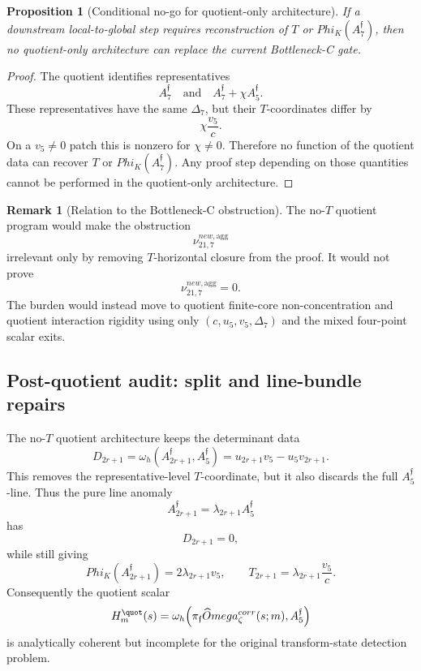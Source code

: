 \documentclass[11pt,a4paper]{amsart}
\def\Omega{Omega}%
\def\Phi{Phi}%
\def\corr{corr}%
\def\new{new}%
\theoremstyle{plain}
\newtheorem{proposition}[theorem]{Proposition}
\theoremstyle{definition}
\newtheorem{remark}[theorem]{Remark}
\newcommand{\corr}{\mathrm{corr}}
\newcommand{\new}{\mathrm{new}}
\begin{document}
\begin{proposition}[Conditional no-go for quotient-only architecture]
\label{prop:conditional-no-go-quotient-only-architecture}
If a downstream local-to-global step requires reconstruction of \(T\) or
\(\Phi_K(A_7^{\mathfrak f})\), then no quotient-only architecture can replace
the current Bottleneck-C gate.
\end{proposition}

\begin{proof}
The quotient identifies representatives
\[
A_7^{\mathfrak f}
\quad\text{and}\quad
A_7^{\mathfrak f}+\chi A_5^{\mathfrak f}.
\]
These representatives have the same \(\Delta_7\), but their \(T\)-coordinates
differ by
\[
\chi\frac{v_5}{c}.
\]
On a \(v_5\ne0\) patch this is nonzero for \(\chi\ne0\).  Therefore no
function of the quotient data can recover \(T\) or
\(\Phi_K(A_7^{\mathfrak f})\).  Any proof step depending on those quantities
cannot be performed in the quotient-only architecture.
\end{proof}

\begin{remark}[Relation to the Bottleneck-C obstruction]
\label{rem:no-t-relation-to-bc-obstruction}
The no-\(T\) quotient program would make the obstruction
\[
\nu_{21,7}^{\new,\mathrm{agg}}
\]
irrelevant only by removing \(T\)-horizontal closure from the proof.  It would
not prove
\[
\nu_{21,7}^{\new,\mathrm{agg}}=0.
\]
The burden would instead move to quotient finite-core non-concentration and
quotient interaction rigidity using only \((c,u_5,v_5,\Delta_7)\) and the
mixed four-point scalar exits.
\end{remark}

\subsection{Post-quotient audit: split and line-bundle repairs}
\label{subsec:post-quotient-split-line-bundle-audit}

The no-\(T\) quotient architecture keeps the determinant data
\[
D_{2r+1}
=
\omega_h(A_{2r+1}^{\mathfrak f},A_5^{\mathfrak f})
=
u_{2r+1}v_5-u_5v_{2r+1}.
\]
This removes the representative-level \(T\)-coordinate, but it also discards
the full \(A_5^{\mathfrak f}\)-line.  Thus the pure line anomaly
\[
A_{2r+1}^{\mathfrak f}
=
\lambda_{2r+1}A_5^{\mathfrak f}
\]
has
\[
D_{2r+1}=0,
\]
while still giving
\[
\Phi_K(A_{2r+1}^{\mathfrak f})
=
2\lambda_{2r+1}v_5,
\qquad
T_{2r+1}
=
\lambda_{2r+1}\frac{v_5}{c}.
\]
Consequently the quotient scalar
\[
H_m^{\quot}(s)
=
\omega_h\!\left(
\pi_{\mathfrak f}\widehat\Omega_\zeta^{\corr}(s;m),
A_5^{\mathfrak f}
\right)
\]
is analytically coherent but incomplete for the original transform-state
detection problem.
\end{document}
